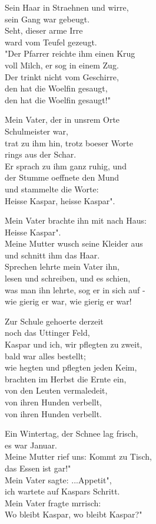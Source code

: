 \documentclass[
  letterpaper,
  a5paper]{memoir}
\begin{document}
Sein Haar in Straehnen und wirre,\\
sein Gang war gebeugt.\\
Seht, dieser arme Irre\\
ward vom Teufel gezeugt.\\
"Der Pfarrer reichte ihm einen Krug\\
voll Milch, er sog in einem Zug.\\
Der trinkt nicht vom Geschirre,\\
den hat die Woelfin gesaugt,\\
den hat die Woelfin gesaugt!"

Mein Vater, der in uns\textquotesingle rem Orte\\
Schulmeister war,\\
trat zu ihm hin, trotz boeser Worte\\
rings aus der Schar.\\
Er sprach zu ihm ganz ruhig, und\\
der Stumme oeffnete den Mund\\
und stammelte die Worte:\\
Heisse Kaspar, heisse Kaspar".

Mein Vater brachte ihn mit nach Haus:\\
Heisse Kaspar".\\
Meine Mutter wusch seine Kleider aus\\
und schnitt ihm das Haar.\\
Sprechen lehrte mein Vater ihn,\\
lesen und schreiben, und es schien,\\
was man ihn lehrte, sog er in sich auf -\\
wie gierig er war, wie gierig er war!

Zur Schule gehoerte derzeit\\
noch das Uttinger Feld,\\
Kaspar und ich, wir pflegten zu zweit,\\
bald war alles bestellt;\\
wie hegten und pflegten jeden Keim,\\
brachten im Herbst die Ernte ein,\\
von den Leuten vermaledeit,\\
von ihren Hunden verbellt,\\
von ihren Hunden verbellt.

Ein Wintertag, der Schnee lag frisch,\\
es war Januar.\\
Meine Mutter rief uns: Kommt zu Tisch,\\
das Essen ist gar!"\\
Mein Vater sagte: ...Appetit",\\
ich wartete auf Kaspars Schritt.\\
Mein Vater fragte mrrisch:\\
Wo bleibt Kaspar, wo bleibt Kaspar?"
\end{document}
